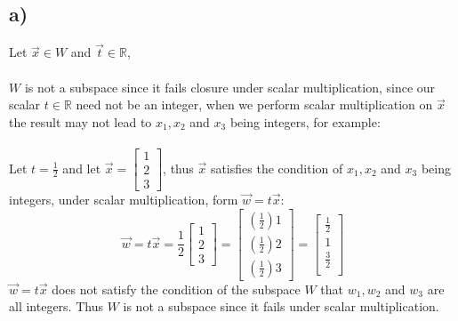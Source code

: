 \documentclass{article}
\begin{document}
 \subsection*{a)}
 Let $\vec{x}\in W$ and $\vec{t}\in \mathbb{R}$,\\\\
 $W$ is not a subspace since it fails closure under scalar multiplication, since our scalar $t\in \mathbb{R}$ need not be an integer, when we perform scalar multiplication on $\vec{x}$ the result may not lead to $x_1,x_2$ and $x_3$ being integers, for example:\\\\
Let $t=\frac{1}{2}$ and let $\vec{x}=\begin{bmatrix}
    1\\2\\3
\end{bmatrix}$, thus $\vec{x}$ satisfies the condition of $x_1,x_2$ and $x_3$ being integers, under scalar multiplication, form $\vec{w}=t\vec{x}$:$$\vec{w}=t\vec{x}=\frac{1}{2}\begin{bmatrix}
    1\\2\\3
\end{bmatrix}=\begin{bmatrix}
    (\frac{1}{2})1\\(\frac{1}{2})2\\(\frac{1}{2})3
\end{bmatrix}=\begin{bmatrix}
    \frac{1}{2}\\
    1\\
    \frac{3}{2}\\
\end{bmatrix}$$
$\vec{w}=t\vec{x}$ does not satisfy the condition of the subspace $W$ that $w_1,w_2$ and $w_3$ are all integers. Thus $W$ is not a subspace since it fails under scalar multiplication. 
\end{document}
